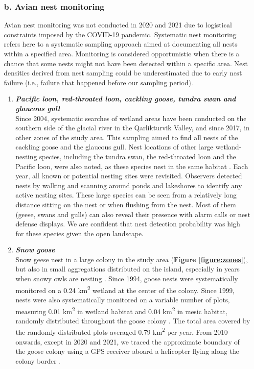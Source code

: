 \documentclass[a4paper,twoside,12pt]{article}
\begin{document}
                \subsubsection*{b. Avian nest monitoring}
Avian nest monitoring was not conducted in 2020 and 2021 due to logistical constraints imposed by the COVID-19 pandemic. Systematic nest monitoring refers here to a systematic sampling approach aimed at documenting all nests within a specified area. Monitoring is considered opportunistic when there is a chance that some nests might not have been detected within a specific area. Nest densities derived from nest sampling could be underestimated due to early nest failure (i.e., failure that happened before our sampling period).

        \begin{enumerate}[label=\roman*]
        \item[] \textit{\textbf{Pacific loon, red-throated loon, cackling goose, tundra swan and glaucous gull}}\\
        Since 2004, systematic searches of wetland areas have been conducted on the southern side of the glacial river in the Qarlikturvik Valley, and since 2017, in other zones of the study area. This sampling aimed to find all nests of the cackling goose and the glaucous gull. Nest locations of other large wetland-nesting species, including the tundra swan, the red-throated loon and the Pacific loon, were also noted, as these species nest in the same habitat \citep{duchesne2021,gauthier2024a}. Each year, all known or potential nesting sites were revisited. Observers detected nests by walking and scanning around ponds and lakeshores to identify any active nesting sites. These large species can be seen from a relatively long distance sitting on the nest or when flushing from the nest. Most of them (geese, swans and gulls) can also reveal their presence with alarm calls or nest defense displays. We are confident that nest detection probability was high for these species given the open landscape.\\
        
        \item[] \textit{\textbf{Snow goose}}\\
        Snow geese nest in a large colony in the study area (\textbf{Figure \ref{figure:zones}}), but also in small aggregations distributed on the island, especially in years when snowy owls are nesting \citep{lepage1996,reed2002}. Since 1994, goose nests were systematically monitored on a 0.24 km\textsuperscript{2} wetland at the center of the colony. Since 1999, nests were also systematically monitored on a variable number of plots, measuring 0.01 km\textsuperscript{2} in wetland habitat and 0.04 km\textsuperscript{2} in mesic habitat, randomly distributed throughout the goose colony \citep{gauthier2020goose}. The total area covered by the randomly distributed plots averaged 0.79  km\textsuperscript{2} per year. From 2010 onwards, except in 2020 and 2021, we traced the approximate boundary of the goose colony using a GPS receiver aboard a helicopter flying along the colony border \citep{duchesne2021}.
        

\end{enumerate}
\end{document}
